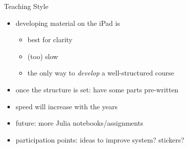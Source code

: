 \documentclass{beamer}
\begin{document}
\begin{frame}{Teaching Style}

\begin{itemize}
  \item developing material on the iPad is 
  \begin{itemize}
    \item best for clarity
    \item (too) slow
    \item the only way to \emph{develop} a well-structured course
  \end{itemize}
  \item once the structure is set: have some parts pre-written
  \item speed will increase with the years
  \item future: more Julia notebooks/assignments
  \item participation points: ideas to improve system? stickers?
\end{itemize}

\end{frame}
\end{document}
